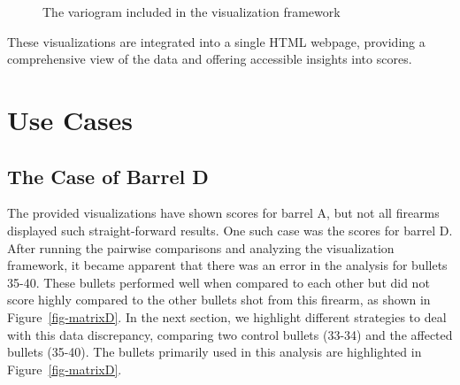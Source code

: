 \documentclass[
  12pt]{article}
\begin{document}
\begin{figure}[H]


\caption{\label{fig-variogramA}The variogram included in the
visualization framework}

\end{figure}%

These visualizations are integrated into a single HTML webpage,
providing a comprehensive view of the data and offering accessible
insights into scores.

\section{Use Cases}\label{use-cases}

\subsection{The Case of Barrel D}\label{the-case-of-barrel-d}

The provided visualizations have shown scores for barrel A, but not all
firearms displayed such straight-forward results. One such case was the
scores for barrel D. After running the pairwise comparisons and
analyzing the visualization framework, it became apparent that there was
an error in the analysis for bullets 35-40. These bullets performed well
when compared to each other but did not score highly compared to the
other bullets shot from this firearm, as shown in
Figure~\ref{fig-matrixD}. In the next section, we highlight different
strategies to deal with this data discrepancy, comparing two control
bullets (33-34) and the affected bullets (35-40). The bullets primarily
used in this analysis are highlighted in Figure~\ref{fig-matrixD}.
\end{document}
